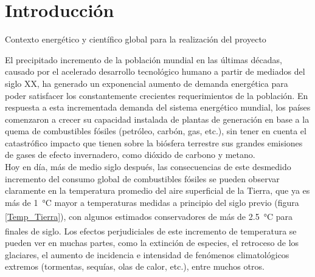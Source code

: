\section{Introducción}
\thispagestyle{plain}

\vspace{0.5cm}

\Large\scshape
\begin{center}
    {\Medium Contexto energético y científico global para la realización del proyecto}
\end{center}
\normalfont

\divider

El precipitado incremento de la población mundial en las últimas décadas, causado por el acelerado desarrollo tecnológico humano a partir de mediados del siglo XX, ha generado un exponencial aumento de demanda energética para poder satisfacer los constantemente crecientes requerimientos de la población. En respuesta a esta incrementada demanda del sistema energético mundial, los países comenzaron a crecer su capacidad instalada de plantas de generación en base a la quema de combustibles fósiles (petróleo, carbón, gas, etc.), sin tener en cuenta el catastrófico impacto que tienen sobre la biósfera terrestre sus grandes emisiones de gases de efecto invernadero, como dióxido de carbono y metano.\\

Hoy en día, más de medio siglo después, las consecuencias de este desmedido incremento del consumo global de combustibles fósiles se pueden observar claramente en la temperatura promedio del aire superficial de la Tierra, que ya es más de \SI{1}{\celsius} mayor a temperaturas medidas a principio del siglo previo (figura \ref{Temp_Tierra})\textsuperscript{\cite{TempGlobal}}, con algunos estimados conservadores de más de \SI{2.5}{\celsius} para finales de siglo.\textsuperscript{\cite{EstimadoTemp}} Los efectos perjudiciales de este incremento de temperatura se pueden ver en muchas partes, como la extinción de especies, el retroceso de los glaciares, el aumento de incidencia e intensidad de fenómenos climatológicos extremos (tormentas, sequías, olas de calor, etc.), entre muchos otros.

